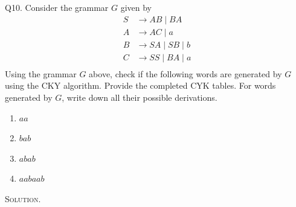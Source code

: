 Q10.
Consider the grammar $G$ given by
  \begin{align*}
    S &\rightarrow AB \mid BA \\
    A &\rightarrow AC \mid a \\
    B &\rightarrow SA \mid SB \mid b \\
    C &\rightarrow SS \mid BA \mid a \\
  \end{align*}
  Using the grammar $G$ above, check if the following words are generated
  by $G$ using the CKY algorithm. Provide the completed CYK tables.
  For words generated by $G$, write down all their
  possible derivations. 
  \begin{enumerate}
  \item[(a)] $aa$
  \item[(b)] $bab$
  \item[(c)] $abab$
  \item[(d)] $aabaab$
  \end{enumerate}

\textsc{Solution}.






